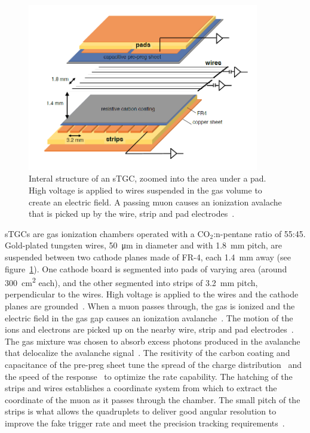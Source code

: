 \begin{figure}
    \centering
    \includegraphics[width = 0.9\textwidth]{figures/stgc_internals.png}
    \caption{Interal structure of an sTGC, zoomed into the area under a pad. High voltage is applied to wires suspended in the gas volume to create an electric field. A passing muon causes an ionization avalache that is picked up by the wire, strip and pad electrodes~\cite{lefebvre_precision_2020}.}
    \label{fig:stgc_internals}
\end{figure}

sTGCs are gas ionization chambers operated with a CO$_2$:n-pentane ratio of 55:45. Gold-plated tungsten wires, \SI{50}{\micro\meter} in diameter and with \SI{1.8}{mm} pitch, are suspended between two cathode planes made of FR-4, each \SI{1.4}{mm} away (see figure~\ref{fig:stgc_internals}). One cathode board is segmented into pads of varying area (around \SI{300}{cm^2} each), and the other segmented into strips of \SI{3.2}{mm} pitch, perpendicular to the wires. High voltage is applied to the wires and the cathode planes are grounded~\cite{nsw_tdr, perez-codina_small-strip_2016}. When a muon passes through, the gas is ionized and the electric field in the gas gap causes an ionization avalanche~\cite{townsend_electricity_1915}. The motion of the ions and electrons are picked up on the nearby wire, strip and pad electrodes~\cite{nsw_tdr}. The gas mixture was chosen to absorb excess photons produced in the avalanche that delocalize the avalanche signal~\cite{majewski_thin_1983}. The resitivity of the carbon coating and capacitance of the pre-preg sheet tune the spread of the charge distribution~\cite{gatti_optimum_1979} and the speed of the response~\cite{battistoni_resistive_1982} to optimize the rate capability. The hatching of the strips and wires establishes a coordinate system from which to extract the coordinate of the muon as it passes through the chamber. The small pitch of the strips is what allows the quadruplets to deliver good angular resolution to improve the fake trigger rate and meet the precision tracking requirements~\cite{nsw_tdr}.

